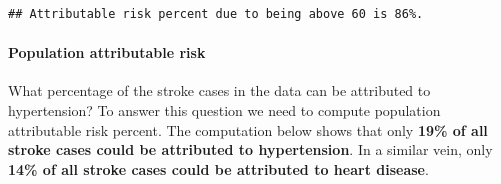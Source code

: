 \documentclass[
]{article}
\newenvironment{Shaded}{\begin{snugshade}}{\end{snugshade}}
\newcommand{\DecValTok}[1]{\textcolor[rgb]{0.00,0.00,0.81}{#1}}
\newcommand{\FunctionTok}[1]{\textcolor[rgb]{0.13,0.29,0.53}{\textbf{#1}}}
\newcommand{\NormalTok}[1]{#1}
\newcommand{\OtherTok}[1]{\textcolor[rgb]{0.56,0.35,0.01}{#1}}
\newcommand{\SpecialCharTok}[1]{\textcolor[rgb]{0.81,0.36,0.00}{\textbf{#1}}}
\newcommand{\StringTok}[1]{\textcolor[rgb]{0.31,0.60,0.02}{#1}}
\begin{document}
\begin{Shaded}
\end{Shaded}

\begin{verbatim}
## Attributable risk percent due to being above 60 is 86%.
\end{verbatim}

\paragraph{\texorpdfstring{\textbf{Population attributable
risk}}{Population attributable risk}}\label{population-attributable-risk}

What percentage of the stroke cases in the data can be attributed to
hypertension? To answer this question we need to compute population
attributable risk percent. The computation below shows that only
\textbf{19\% of all stroke cases could be attributed to hypertension}.
In a similar vein, only \textbf{14\% of all stroke cases could be
attributed to heart disease}.
\end{document}
